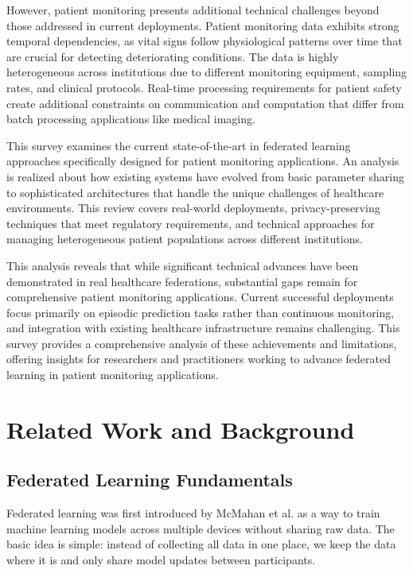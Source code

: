 \documentclass[3p,times,procedia]{elsarticle}
\begin{document}
However, patient monitoring presents additional technical challenges beyond those addressed in current deployments. Patient monitoring data exhibits strong temporal dependencies, as vital signs follow physiological patterns over time that are crucial for detecting deteriorating conditions. The data is highly heterogeneous across institutions due to different monitoring equipment, sampling rates, and clinical protocols. Real-time processing requirements for patient safety create additional constraints on communication and computation that differ from batch processing applications like medical imaging.

This survey examines the current state-of-the-art in federated learning approaches specifically designed for patient monitoring applications. An analysis is realized about how existing systems have evolved from basic parameter sharing to sophisticated architectures that handle the unique challenges of healthcare environments. This review covers real-world deployments, privacy-preserving techniques that meet regulatory requirements, and technical approaches for managing heterogeneous patient populations across different institutions.

This analysis reveals that while significant technical advances have been demonstrated in real healthcare federations, substantial gaps remain for comprehensive patient monitoring applications. Current successful deployments focus primarily on episodic prediction tasks rather than continuous monitoring, and integration with existing healthcare infrastructure remains challenging. This survey provides a comprehensive analysis of these achievements and limitations, offering insights for researchers and practitioners working to advance federated learning in patient monitoring applications.


\section{Related Work and Background}

\subsection{Federated Learning Fundamentals}

Federated learning was first introduced by McMahan et al. \cite{McMahan2017} as a way to train machine learning models across multiple devices without sharing raw data. The basic idea is simple: instead of collecting all data in one place, we keep the data where it is and only share model updates between participants.
\end{document}
